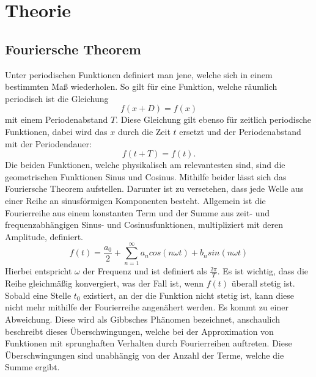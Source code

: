 \section{Theorie}
\label{sec:Theorie}

\subsection{Fouriersche Theorem}
\label{subsec:FTheorem}
Unter periodischen Funktionen definiert man jene, welche sich in einem bestimmten 
Maß wiederholen. So gilt für eine Funktion, welche räumlich periodisch ist die 
Gleichung
\begin{equation}
    \label{eqn:1}
    f(x+D) = f(x)
\end{equation}
mit einem Periodenabstand $T$. Diese Gleichung gilt ebenso für zeitlich periodische 
Funktionen, dabei wird das $x$ durch die Zeit $t$ ersetzt und der Periodenabstand 
mit der Periodendauer:
\begin{equation}
    \label{eqn:2}
    f(t+T) = f(t).
\end{equation}
Die beiden Funktionen, welche physikalisch am relevantesten sind, sind die 
geometrischen Funktionen Sinus und Cosinus. Mithilfe beider lässt sich das 
Fouriersche Theorem aufstellen. Darunter ist zu versetehen, dass jede Welle 
aus einer Reihe an sinusförmigen Komponenten besteht. Allgemein ist die 
Fourierreihe aus einem konstanten Term und der Summe aus zeit- und 
frequenzabhängigen Sinus- und Cosinusfunktionen, multipliziert mit deren 
Amplitude, definiert.
\begin{equation}
    \label{eqn:3}
    f(t) = \frac{a_0}{2} + \sum\limits_{n=1}^\infty a_n cos \left(n \omega t\right) + b_n sin \left(n \omega t\right)
\end{equation}
Hierbei entspricht $\omega$ der Frequenz und ist definiert als $\frac{2 \pi}{T}$.
Es ist wichtig, dass die Reihe gleichmäßig konvergiert, was der Fall ist, wenn 
$f(t)$ überall stetig ist. Sobald eine Stelle $t_0$ existiert, an der die Funktion 
nicht stetig ist, kann diese nicht mehr mithilfe der Fourierreihe angenähert 
werden. Es kommt zu einer Abweichung. Diese wird als Gibbsches Phänomen bezeichnet, 
anschaulich beschreibt dieses Überschwingungen, welche bei der Approximation 
von Funktionen mit sprunghaften Verhalten durch Fourierreihen auftreten. Diese 
Überschwingungen sind unabhängig von der Anzahl der Terme, welche die Summe ergibt.

